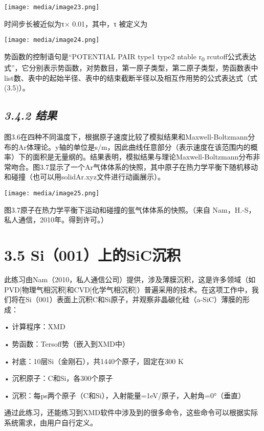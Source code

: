\documentclass[
]{article}
\begin{document}
\texttt{[image: media/image23.png]}

时间步长被近似为τ× 0.01，其中，τ 被定义为

\texttt{[image: media/image24.png]}

势函数的控制语句是``POTENTIAL PAIR type1 type2 ntable r\textsubscript{0}
rcutoff公式表达式''，它分别表示势函数，对势数目，第一原子类型，第二原子类型，势函数表中list数、表中的起始半径、表中的结束截断半径以及相互作用势的公式表达式（式(3.5)）。

\hypertarget{ux7ed3ux679c-3}{%
\subsection{\texorpdfstring{\emph{3.4.2
结果}}{3.4.2 结果}}\label{ux7ed3ux679c-3}}

图3.6在四种不同温度下，根据原子速度比较了模拟结果和Maxwell-Boltzmann分布的Ar体理论。y轴的单位是s/m，因此曲线任意部分（表示速度在该范围内的概率）下的面积是无量纲的。结果表明，模拟结果与理论Maxwell-Boltzmann分布非常吻合。图3.7显示了一个Ar气体体系的快照，其中原子在热力学平衡下随机移动和碰撞（也可以用solidAr.xyz文件进行动画展示）。

\texttt{[image: media/image25.png]}

图3.7原子在热力学平衡下运动和碰撞的氩气体体系的快照。（来自
Nam，H.-S，私人通信，2010年。得到许可。）

\hypertarget{si001ux4e0aux7684sicux6c89ux79ef}{%
\section{3.5
Si（001）上的SiC沉积}\label{si001ux4e0aux7684sicux6c89ux79ef}}

此练习由Nam（2010，私人通信公司）提供，涉及薄膜沉积，这是许多领域（如PVD{[}物理气相沉积{]}和CVD{[}化学气相沉积{]}）普遍采用的技术。在这项工作中，我们将在Si（001）表面上沉积C和Si原子，并观察非晶碳化硅（a-SiC）薄膜的形成：

• 计算程序：XMD

• 势函数：Tersoff势（嵌入到XMD中）

• 衬底：10层Si（金刚石），共1440个原子，固定在300 K

• 沉积原子：C和Si，各300个原子

• 沉积：每ps两个原子（C和Si），入射能量=1eV/原子，入射角=0°（垂直）

通过此练习，还能练习到XMD软件中涉及到的很多命令，这些命令可以根据实际系统需求，由用户自行定义。
\end{document}
